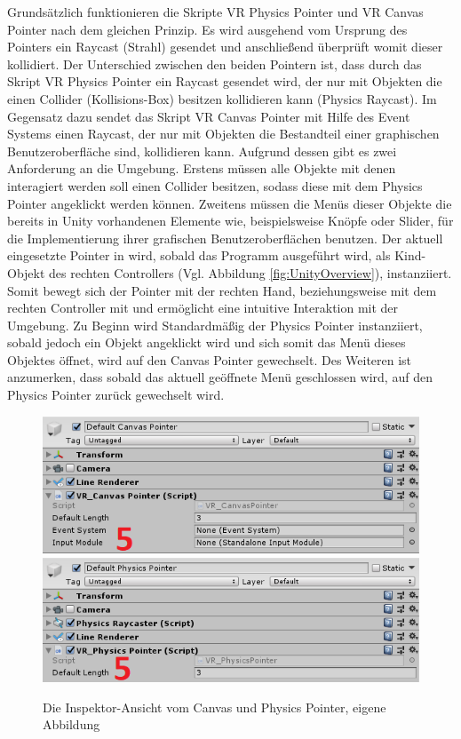 \newline
Grundsätzlich funktionieren die Skripte VR Physics Pointer und VR Canvas Pointer nach dem gleichen Prinzip. Es wird ausgehend vom Ursprung des Pointers ein Raycast (Strahl) gesendet und anschließend überprüft womit dieser kollidiert. Der Unterschied zwischen den beiden Pointern ist, dass durch das Skript VR Physics Pointer ein Raycast gesendet wird, der nur mit Objekten die einen Collider (Kollisions-Box) besitzen kollidieren kann (Physics Raycast). Im Gegensatz dazu sendet das Skript VR Canvas Pointer mit Hilfe des Event Systems einen Raycast, der nur mit Objekten die Bestandteil einer graphischen Benutzeroberfläche sind, kollidieren kann. Aufgrund dessen gibt es zwei Anforderung an die Umgebung. Erstens müssen alle Objekte mit denen interagiert werden soll einen Collider besitzen, sodass diese mit dem Physics Pointer angeklickt werden können. Zweitens müssen die Menüs dieser Objekte die bereits in Unity vorhandenen Elemente wie, beispielsweise Knöpfe oder Slider, für die Implementierung ihrer grafischen Benutzeroberflächen benutzen.
\newline
Der aktuell eingesetzte Pointer in wird, sobald das Programm ausgeführt wird, als Kind-Objekt des rechten Controllers (Vgl. Abbildung \ref{fig:UnityOverview}), instanziiert. Somit bewegt sich der Pointer mit der rechten Hand, beziehungsweise mit dem rechten Controller mit und ermöglicht eine intuitive Interaktion mit der Umgebung. Zu Beginn wird Standardmäßig der Physics Pointer instanziiert, sobald jedoch ein Objekt angeklickt wird und sich somit das Menü dieses Objektes öffnet, wird auf den Canvas Pointer gewechselt. Des Weiteren ist anzumerken, dass sobald das aktuell geöffnete Menü geschlossen wird, auf den Physics Pointer zurück gewechselt wird.
\begin{figure}[h]
	\centering
	\includegraphics[width=0.49\linewidth]{Bilder/A42_CanvasPointer2}
	\includegraphics[width=0.49\linewidth]{Bilder/A43_PhysicsPointer2}
	\caption{Die Inspektor-Ansicht vom Canvas und Physics Pointer, eigene Abbildung}
	\label{fig:Pointer}
\end{figure}

